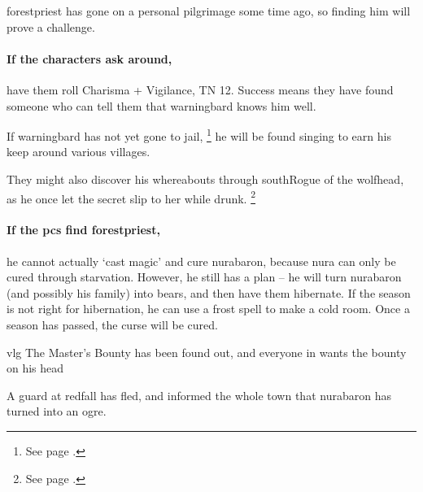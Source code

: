 \Gls{forestpriest} has gone on a personal pilgrimage some time ago, so finding him will prove a challenge.

\paragraph{If the characters ask around,}
have them roll Charisma + Vigilance, TN 12.
Success means they have found someone who can tell them that \gls{warningbard} knows him well.

If \gls{warningbard} has not yet gone to jail,%
\footnote{See page \pageref{warningbard}.}
he will be found singing to earn his keep around various \glspl{village}.

They might also discover his whereabouts through \gls{southRogue} of the \gls{wolfhead}, as he once let the secret slip to her while drunk.%
\footnote{See page \pageref{courtbile}.}

\paragraph{If the \glspl{pc} find \gls{forestpriest},}
he cannot actually `cast magic' and cure \gls{nurabaron}, because nura can only be cured through starvation.
However, he still has a plan -- he will turn \gls{nurabaron} (and possibly his family) into bears, and then have them hibernate.
If the season is not right for hibernation, he can use a frost spell to make a cold room.
Once a season has passed, the curse will be cured.


{\gls{vlg} The Master's Bounty}%
{ has been found out, and everyone in  wants the bounty on his head}%
\label{mastersBounty}

A guard at \gls{redfall} has fled, and informed the whole town that \gls{nurabaron} has turned into an ogre.

